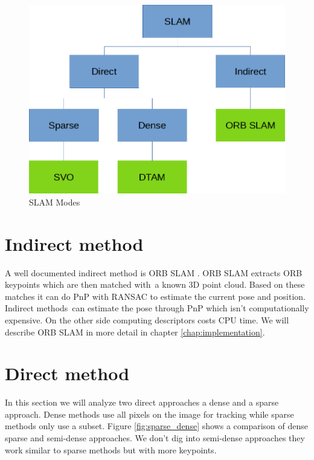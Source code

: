 \documentclass[11pt,a4paper,titlepage,oneside]{report}
\begin{document}
\begin{figure}[H]
	\includegraphics[width=1.0\textwidth]{img/slam_modes.png}
	\caption{SLAM Modes}\label{fig:slammodes}
\end{figure}


\section{Indirect method}

A well documented indirect method is ORB SLAM \cite{orbslam}. ORB SLAM extracts ORB keypoints which are then matched with a known 3D point cloud. Based on these matches it can do PnP with RANSAC \cite{ransac} to estimate the current pose and position. Indirect methods can estimate the pose through PnP which isn’t computationally expensive. On the other side computing descriptors costs CPU time. We will describe ORB SLAM in more detail in chapter \ref{chap:implementation}.

\section{Direct method}

In this section we will analyze two direct approaches a dense and a sparse approach. Dense methods use all pixels on the image for tracking while sparse methods only use a subset. Figure \ref{fig:sparse_dense} shows a comparison of dense sparse and semi-dense approaches. We don't dig into semi-dense approaches they work similar to sparse methods but with more keypoints.
\end{document}
